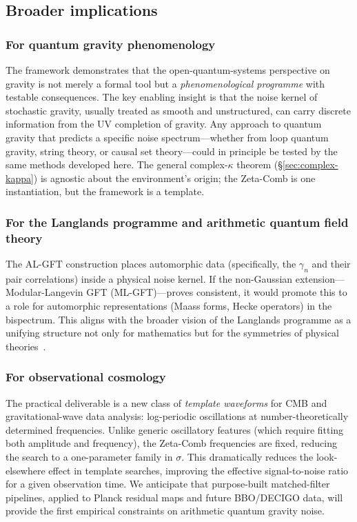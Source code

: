 \documentclass[12pt,a4paper]{article}
\begin{document}
\subsection{Broader implications}
\label{subsec:broader-implications}

\subsubsection{For quantum gravity phenomenology}

The framework demonstrates that the open-quantum-systems
perspective on gravity is not merely a formal tool but a
\emph{phenomenological programme} with testable
consequences.
The key enabling insight is that the noise kernel of
stochastic gravity, usually treated as smooth and
unstructured, can carry discrete information from the
UV completion of gravity.
Any approach to quantum gravity that predicts a specific
noise spectrum---whether from loop quantum gravity,
string theory, or causal set theory---could in principle
be tested by the same methods developed here.
The general complex-$\kappa$ theorem
(\S\ref{sec:complex-kappa}) is agnostic about the
environment's origin; the Zeta-Comb is one instantiation,
but the framework is a template.

\subsubsection{For the Langlands programme and arithmetic
              quantum field theory}

The AL-GFT construction places automorphic data
(specifically, the $\gamma_{n}$ and their pair
correlations) inside a physical noise kernel.
If the non-Gaussian extension---Modular-Langevin GFT
(ML-GFT)---proves consistent, it would promote this
to a role for automorphic representations (Maass forms,
Hecke operators) in the bispectrum.
This aligns with the broader vision of the Langlands
programme as a unifying structure not only for
mathematics but for the symmetries of physical
theories~\cite{Langlands1970,Frenkel2007}.

\subsubsection{For observational cosmology}

The practical deliverable is a new class of
\emph{template waveforms} for CMB and gravitational-wave
data analysis: log-periodic oscillations at
number-theoretically determined frequencies.
Unlike generic oscillatory features (which require
fitting both amplitude and frequency), the Zeta-Comb
frequencies are fixed, reducing the search to a
one-parameter family in $\sigma$.
This dramatically reduces the look-elsewhere effect
in template searches, improving the effective
signal-to-noise ratio for a given observation time.
We anticipate that purpose-built matched-filter
pipelines, applied to Planck residual maps and future
BBO/DECIGO data, will provide the first empirical
constraints on arithmetic quantum gravity noise.
\end{document}
